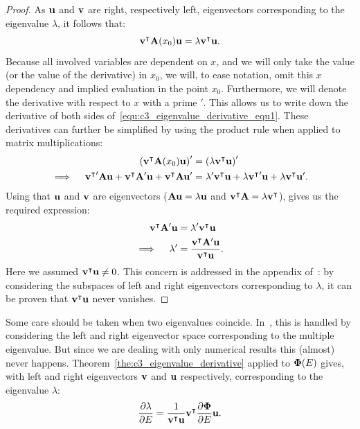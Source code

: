 \begin{proof}
  As $\vb{u}$ and $\vb{v}$ are right, respectively left, eigenvectors corresponding to the eigenvalue $\lambda$, it follows that:
  \begin{equation}\label{equ:c3_eigenvalue_derivative_equ1}
    {\vb{v}}^\intercal\vb{A}(x_0)\vb{u}  = \lambda {\vb{v}}^\intercal\vb{u}\text{.}
  \end{equation}
  Because all involved variables are dependent on $x$, and we will only take the value (or the value of the derivative) in $x_0$, we will, to ease notation, omit this $x$ dependency and implied evaluation in the point $x_0$. Furthermore, we will denote the derivative with respect to $x$ with a prime $'$. This allows us to write down the derivative of both sides of~\eqref{equ:c3_eigenvalue_derivative_equ1}. These derivatives can further be simplified by using the product rule when applied to matrix multiplications:
  \begin{align*}
    \left({\vb{v}}^\intercal\vb{A}(x_0)\vb{u}\right)'                                                                    & = \left(\lambda {\vb{v}}^\intercal\vb{u}\right)'                                                                      \\
    \implies \quad {{\vb{v}}^\intercal}'\vb{A}\vb{u} + {\vb{v}}^\intercal\vb{A}'\vb{u} + {\vb{v}}^\intercal\vb{A}\vb{u}' & = \lambda' {\vb{v}}^\intercal\vb{u} + \lambda {{\vb{v}}^\intercal}'\vb{u} + \lambda {\vb{v}}^\intercal\vb{u}'\text{.}
  \end{align*}
  Using that $\vb{u}$ and $\vb{v}$ are eigenvectors ($\vb{A} \vb{u} = \lambda \vb{u}$ and ${\vb{v}}^\intercal\vb{A} = \lambda {\vb{v}}^\intercal$), gives us the required expression:
  \begin{align*}
    {\vb{v}}^\intercal\vb{A}'\vb{u} & = \lambda' {\vb{v}}^\intercal\vb{u}                                         \\
    \implies \quad \lambda'         & = \frac{{\vb{v}}^\intercal\vb{A}'\vb{u}}{{\vb{v}}^\intercal\vb{u}} \text{.}
  \end{align*}
  Here we assumed ${\vb{v}}^\intercal\vb{u} \neq 0$. This concern is addressed in the appendix of~\cite{lancaster_eigenvalues_1964}: by considering the subspaces of left and right eigenvectors corresponding to $\lambda$, it can be proven that ${\vb{v}}^\intercal\vb{u}$ never vanishes.
\end{proof}

Some care should be taken when two eigenvalues coincide. In~\cite{lancaster_eigenvalues_1964}, this is handled by considering the left and right eigenvector space corresponding to the multiple eigenvalue. But since we are dealing with only numerical results this (almost) never happens. Theorem~\ref{the:c3_eigenvalue_derivative} applied to $\vb{\Phi}(E)$ gives, with left and right eigenvectors $\vb{v}$ and $\vb{u}$ respectively, corresponding to the eigenvalue $\lambda$:
$$
  \pdv{\lambda}{E} = \frac{1}{{\vb{v}}^\intercal\vb{u}}{\vb{v}}^\intercal \pdv{\vb{\Phi}}{E} \vb{u} \text{.}
$$

